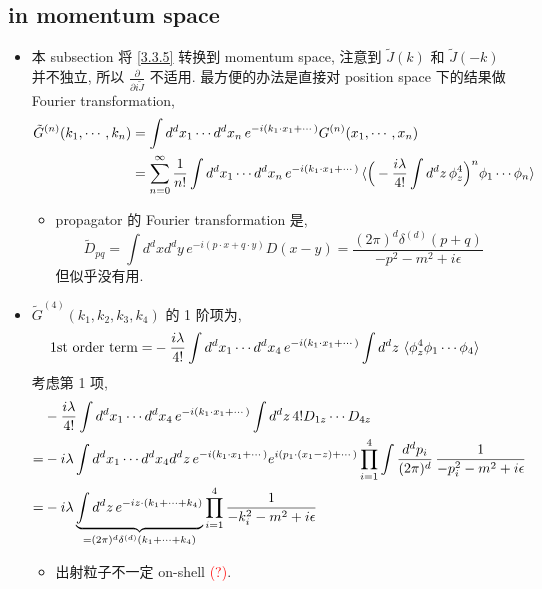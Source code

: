 \subsection{in momentum space} \label{subsection 3.3.2}
\begin{itemize}
	\item 本 subsection 将 \eqref{3.3.5} 转换到 momentum space, 注意到 $\tilde{J}(k)$ 和 $\tilde{J}(- k)$ 并不独立, 所以 $\frac{\partial}{\partial i \tilde{J}}$ 不适用. 最方便的办法是直接对 position space 下的结果做 Fourier transformation,
	\begin{align}
		\tilde{G}^{(n)}(k_1, \cdots, k_n) &= \int d^d x_1 \cdots d^d x_n \, e^{- i (k_1 \cdot x_1 + \cdots)} G^{(n)}(x_1, \cdots, x_n) \notag \\
		&= \sum_{n = 0}^\infty \frac{1}{n!} \int d^d x_1 \cdots d^d x_n \, e^{- i (k_1 \cdot x_1 + \cdots)} \braket{\Big( - \frac{i \lambda}{4!} \int d^d z \, \phi_z^4 \Big)^n \phi_1 \cdots \phi_n}
	\end{align}
	\begin{itemize}
		\item propagator 的 Fourier transformation 是,
		\begin{equation}
			\tilde{D}_{p q} = \int d^d x d^d y \, e^{- i (p \cdot x + q \cdot y)} D(x - y) = \frac{(2 \pi)^d \delta^{(d)}(p + q)}{- p^2 - m^2 + i \epsilon}
		\end{equation}
		但似乎没有用.
	\end{itemize}
	
	\item $\tilde{G}^{(4)}(k_1, k_2, k_3, k_4)$ 的 1 阶项为,
	\begin{align}
		\text{1st order term} =& - \frac{i \lambda}{4!} \int d^d x_1 \cdots d^d x_4 \, e^{- i (k_1 \cdot x_1 + \cdots)} \int d^d z \, \braket{\phi_z^4 \phi_1 \cdots \phi_4}
	\end{align}
	考虑第 1 项,
	\begin{align}
		& - \frac{i \lambda}{4!} \int d^d x_1 \cdots d^d x_4 \, e^{- i (k_1 \cdot x_1 + \cdots)} \int d^d z \, 4! D_{1 z} \cdots D_{4 z} \notag \\
		=& - i \lambda \int d^d x_1 \cdots d^d x_4 d^d z \, e^{- i (k_1 \cdot x_1 + \cdots)} e^{i (p_1 \cdot (x_1 - z) + \cdots)} \prod_{i = 1}^4 \int \frac{d^d p_i}{(2 \pi)^d} \, \frac{1}{- p_i^2 - m^2 + i \epsilon} \notag \\
		=& - i \lambda \underbrace{\int d^d z \, e^{- i z \cdot (k_1 + \cdots + k_4)}}_{= (2 \pi)^d \delta^{(d)}(k_1 + \cdots + k_4)} \prod_{i = 1}^4 \frac{1}{- k_i^2 - m^2 + i \epsilon}
	\end{align}
	\begin{itemize}
		\item 出射粒子不一定 on-shell \textcolor{red}{(?)}.
	\end{itemize}
	

\end{itemize}
